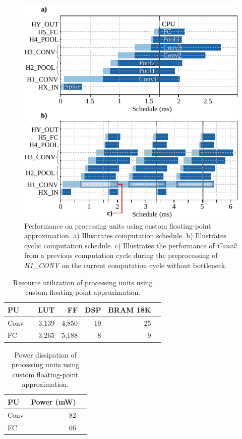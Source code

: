 \begin{figure}[t!]
	\centering
	\includegraphics[width=1\columnwidth]{../figures/latency_cfp_cycle.pdf}
	\caption{Performance on processing units using custom floating-point approximation. a) Illustrates computation schedule. b) Illustrates cyclic computation schedule. c) Illustrates the performance of \emph{Conv2} from a previous computation cycle during the preprocessing of \emph{H1\_CONV} on the current computation cycle without bottleneck.}
	\label{fig:latency_pu_cfp_cycle}
\end{figure}

\begin{table}[h!]\centering
	\caption{Resource utilization of processing units using custom floating-point approximation.}\label{tab:resource_cfp}
	\scriptsize
	\begin{tabular}{lrrrrrr}\toprule
		\textbf{PU} & &\textbf{LUT} &\textbf{FF} &\textbf{DSP} &\textbf{BRAM 18K} \\\midrule
		Conv & &3,139 &4,850 &19 &25 \\
		FC & &3,265 &5,188 &8 &9 \\
		\bottomrule
	\end{tabular}
\end{table}

\begin{table}[h!]\centering
	\caption{Power dissipation of processing units using custom floating-point approximation.}\label{tab:power_cfp}
	\scriptsize
	\begin{tabular}{lrr}\toprule
		\textbf{PU} &\textbf{Power (mW)} \\\midrule
		Conv &82 \\
		FC &66 \\
		\bottomrule
	\end{tabular}
\end{table}

